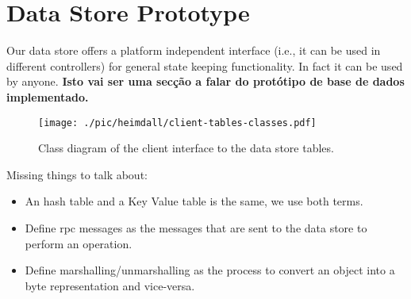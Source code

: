 






\section{Data Store Prototype}
\glsresetall 
Our data store offers a platform independent interface (i.e., it can be used in different controllers) for general state keeping functionality. In fact it can be used by anyone. 
\textbf{Isto vai ser uma secção a falar do protótipo de base de dados implementado.} 
\begin{figure}[ht]
  \centering
  \texttt{[image: ./pic/heimdall/client-tables-classes.pdf]}
  \caption{Class diagram of the client interface to the data store tables.}
\label{fig:design:class-diagram}
\end{figure}

Missing things to talk about: 
\begin{itemize}
\item An hash table and a Key Value table is the same, we use both terms. 
\item Define \gls{rpc} messages as the messages that are sent to the data store to perform an operation. 
\item Define marshalling/unmarshalling as the process to convert an object into a byte representation and vice-versa. 
\end{itemize}


